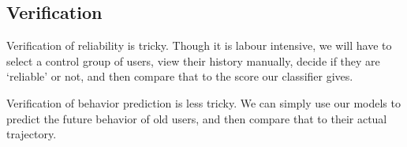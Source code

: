 
\subsection{Verification}
\label{sub:verification}

Verification of reliability is tricky. Though it is labour intensive, we will
have to select a control group of users, view their history manually, decide if
they are `reliable' or not, and then compare that to the score our classifier
gives.

Verification of behavior prediction is less tricky. We can simply use our models
to predict the future behavior of old users, and then compare that to their
actual trajectory.



